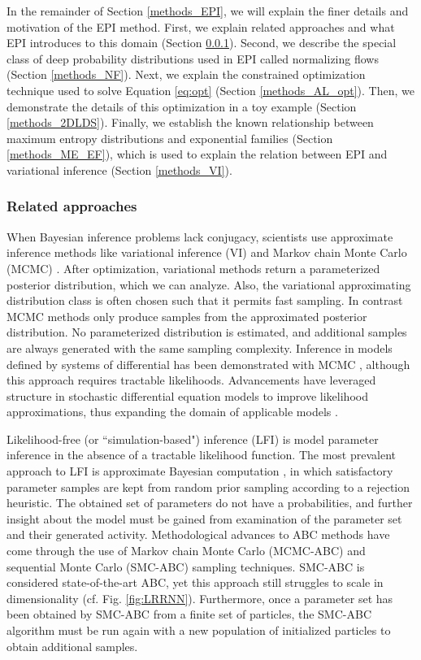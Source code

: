 \documentclass[11pt]{article}
\begin{document}
In the remainder of Section \ref{methods_EPI}, we will explain the finer details and motivation of the EPI method. 
First, we explain related approaches and what EPI introduces to this domain (Section \ref{methods_related}).
Second, we describe the special class of deep probability distributions used in EPI called normalizing flows (Section \ref{methods_NF}).  
Next, we explain the constrained optimization technique used to solve Equation \ref{eq:opt} (Section \ref{methods_AL_opt}).
Then, we demonstrate the details of this optimization in a toy example (Section \ref{methods_2DLDS}).
Finally, we establish the known relationship between maximum entropy distributions and exponential families (Section \ref{methods_ME_EF}), which is used to explain the relation between EPI and variational inference (Section \ref{methods_VI}).

 \subsubsection{Related approaches}\label{methods_related}
 When Bayesian inference problems lack conjugacy, scientists use approximate inference methods like variational inference (VI) \cite{saul1998mean} and Markov chain Monte Carlo (MCMC) \cite{metropolis1953equation, hastings1970monte}. 
After optimization, variational methods return a parameterized posterior distribution, which we can analyze.
Also, the variational approximating distribution class is often chosen such that it permits fast sampling.
In contrast MCMC methods only produce samples from the approximated posterior distribution.
No parameterized distribution is estimated, and additional samples are always generated with the same sampling complexity.
Inference in models defined by systems of differential has been demonstrated with MCMC \cite{girolami2011riemann}, although this approach requires tractable likelihoods.
Advancements have leveraged structure in stochastic differential equation models to improve likelihood approximations, thus expanding the domain of applicable models \cite{golightly2011bayesian}.
 
Likelihood-free (or ``simulation-based") inference (LFI) \cite{cranmer2020frontier} is model parameter inference in the absence of a tractable likelihood function.
The most prevalent approach to LFI is approximate Bayesian computation \cite{beaumont2002approximate}, in which satisfactory parameter samples are kept from random prior sampling according to a rejection heuristic.
The obtained set of parameters do not have a probabilities, and further insight about the model must be gained from examination of the parameter set and their generated activity.
Methodological advances to ABC methods have come through the use of Markov chain Monte Carlo (MCMC-ABC) \cite{marjoram2003markov} and sequential Monte Carlo (SMC-ABC) \cite{sisson2007sequential} sampling techniques.
SMC-ABC is considered state-of-the-art ABC, yet this approach still struggles to scale in dimensionality (cf. Fig. \ref{fig:LRRNN}).
Furthermore, once a parameter set has been obtained by SMC-ABC from a finite set of particles, the SMC-ABC algorithm must be run again with a new population of initialized particles to obtain additional samples.
\end{document}
